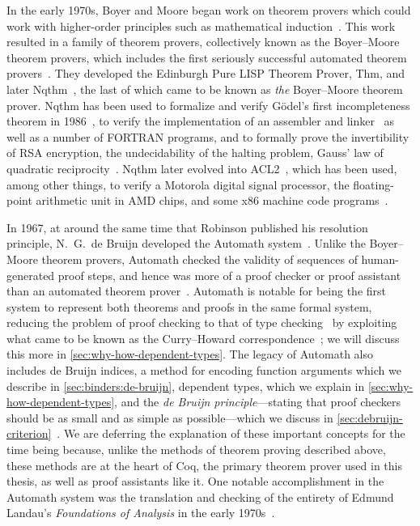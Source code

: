 In the early 1970s, Boyer and Moore began work on theorem provers which could work with higher-order principles such as mathematical induction~\cite[p.~6]{Automation2013Moore}.
This work resulted in a family of theorem provers, collectively known as the Boyer--Moore theorem provers, which includes the first seriously successful automated theorem provers~\cites[p.~8]{Automation2013Moore}{Brief2019Darbari}.
They developed the Edinburgh Pure LISP Theorem Prover, Thm, and later Nqthm~\cites[p.~8]{Automation2013Moore}{Nqthm,wiki:Nqthm}, the last of which came to be known as \emph{the} Boyer--Moore theorem prover.
Nqthm has been used to formalize and verify Gödel's first incompleteness theorem in 1986~\cites{Metamathematics1994Shankar}[p.~29]{Milestones2019Moore}, to verify the implementation of an assembler and linker~\cite{moore2007piton} as well as a number of FORTRAN programs, and to formally prove the invertibility of RSA encryption, the undecidability of the halting problem, Gauss' law of quadratic reciprocity~\cite[pp.~28--29]{Milestones2019Moore}.
Nqthm later evolved into ACL2~\cite{Milestones2019Moore,ACL2Applications,ACL2}, which has been used, among other things, to verify a Motorola digital signal processor, the floating-point arithmetic unit in AMD chips, and some x86 machine code programs~\cite[p.~2]{Milestones2019Moore}.

In 1967, at around the same time that Robinson published his resolution principle, N.~G.~de Bruijn developed the Automath system~\cite{Automath2002Kamareddine,Survey1994deBruijn,mathematical1970Bruijn,wiki:AutoMath}.
Unlike the Boyer--Moore theorem provers, Automath checked the validity of sequences of human-generated proof steps, and hence was more of a proof checker or proof assistant than an automated theorem prover~\cite{ringer2020qed}.
Automath is notable for being the first system to represent both theorems and proofs in the same formal system, reducing the problem of proof checking to that of type checking~\cite{ringer2020qed} by exploiting what came to be known as the Curry--Howard correspondence~\cite{Automath2002Kamareddine}; we will discuss this more in \autoref{sec:why-how-dependent-types}.
The legacy of Automath also includes de Bruijn indices, a method for encoding function arguments which we describe in \autoref{sec:binders:de-bruijn}, dependent types, which we explain in \autoref{sec:why-how-dependent-types}, and the \emph{de Bruijn principle}---stating that proof checkers should be as small and as simple as possible---which we discuss in \autoref{sec:debruijn-criterion}~\cite{ringer2020qed,Automath2002Kamareddine}.
We are deferring the explanation of these important concepts for the time being because, unlike the methods of theorem proving described above, these methods are at the heart of Coq, the primary theorem prover used in this thesis, as well as proof assistants like it.
One notable accomplishment in the Automath system was the translation and checking of the entirety of Edmund Landau's \emph{Foundations of Analysis} in the early 1970s~\cite{Automath2002Kamareddine}.

